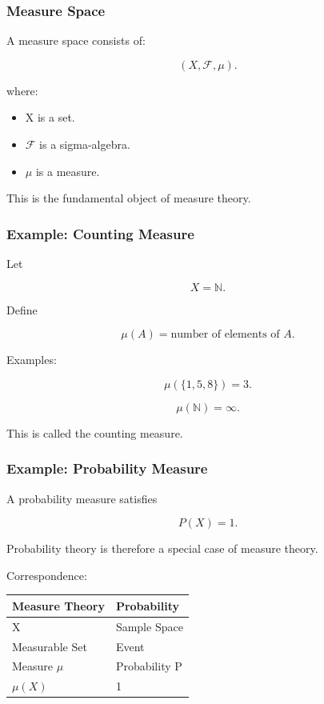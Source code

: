 \documentclass[11pt]{article}
\begin{document}
\subsubsection{Measure Space}
\label{sec:org1d7055f}

A measure space consists of:

\[
(X,\mathcal F,\mu).
\]

where:

\begin{itemize}
\item X is a set.
\item \(\mathcal F\) is a sigma-algebra.
\item \(\mu\) is a measure.
\end{itemize}

This is the fundamental object of measure theory.
\subsubsection{Example: Counting Measure}
\label{sec:orgad31b13}

Let

\[
X=\mathbb N.
\]

Define

\[
\mu(A)
=
\text{number of elements of }A.
\]

Examples:

\[
\mu(\{1,5,8\})=3.
\]

\[
\mu(\mathbb N)=\infty.
\]

This is called the counting measure.
\subsubsection{Example: Probability Measure}
\label{sec:org3e1f5ae}

A probability measure satisfies

\[
P(X)=1.
\]

Probability theory is therefore a special case of measure theory.

Correspondence:

\begin{center}
\begin{tabular}{ll}
Measure Theory & Probability\\
\hline
X & Sample Space\\
Measurable Set & Event\\
Measure \(\mu\) & Probability P\\
\(\mu(X)\) & 1\\
\end{tabular}
\end{center}
\end{document}
